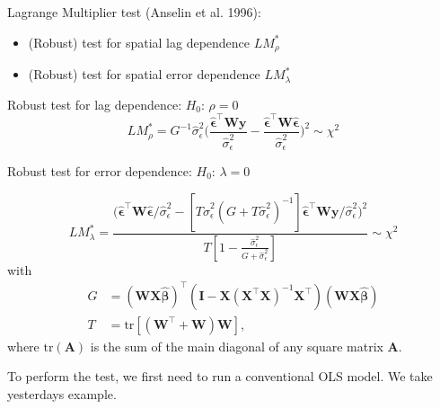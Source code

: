 \documentclass[
  letterpaper,
  DIV=11,
  numbers=noendperiod]{scrreprt}
\begin{document}
Lagrange Multiplier test (Anselin et al. 1996):

\begin{itemize}
\item
  (Robust) test for spatial lag dependence \(LM_\rho^*\)
\item
  (Robust) test for spatial error dependence \(LM_\lambda^*\)
\end{itemize}

Robust test for lag dependence: \(H_0\): \(\rho=0\) \[
        LM_\rho^* = G^{-1} \hat{\sigma}_\epsilon^2
        \big(\frac{ \hat{\boldsymbol{\mathbf{\epsilon}}}^\intercal \boldsymbol{\mathbf{Wy}}}{\hat{\sigma}_\epsilon^2}
        - \frac{\hat{\boldsymbol{\mathbf{\epsilon}}}^\intercal \boldsymbol{\mathbf{W\hat{\epsilon}}}}{\hat{\sigma}_\epsilon^2} \big)^2 \sim \chi^2 
\]

Robust test for error dependence: \(H_0\): \(\lambda=0\)

\[
        LM_\lambda^* = \frac{
        \big( \hat{\boldsymbol{\mathbf{\epsilon}}}^\intercal \boldsymbol{\mathbf{W\hat{\epsilon}}} / \hat{\sigma}_\epsilon^2        
        - [T\hat{\sigma}_\epsilon^2(G + T\hat{\sigma}_\epsilon^2)^{-1}]
         \hat{\boldsymbol{\mathbf{\epsilon}}}^\intercal \boldsymbol{\mathbf{Wy}} / \hat{\sigma}_\epsilon^2 \big)^2
        }{
        T[1 - \frac{\hat{\sigma}_\epsilon^2}{G + \hat{\sigma}_\epsilon^2}]
        } \sim \chi^2
\] with \[
\begin{split}
     G &= (\boldsymbol{\mathbf{WX\hat{\beta}}})^\intercal (\boldsymbol{\mathbf{I}} - \boldsymbol{\mathbf{X}} (\boldsymbol{\mathbf{X}}^\intercal\boldsymbol{\mathbf{X}})^{-1} \boldsymbol{\mathbf{X}}^\intercal) (\boldsymbol{\mathbf{WX\hat{\beta}}})   \\
     T &= \mathrm{tr}[(\boldsymbol{\mathbf{W}}^\intercal + \boldsymbol{\mathbf{W}})\boldsymbol{\mathbf{W}}], 
\end{split}     
\] where \(\mathrm{tr}(\boldsymbol{\mathbf{A}})\) is the sum of the main
diagonal of any square matrix \(\boldsymbol{\mathbf{A}}\).

To perform the test, we first need to run a conventional OLS model. We
take yesterdays example.
\end{document}

